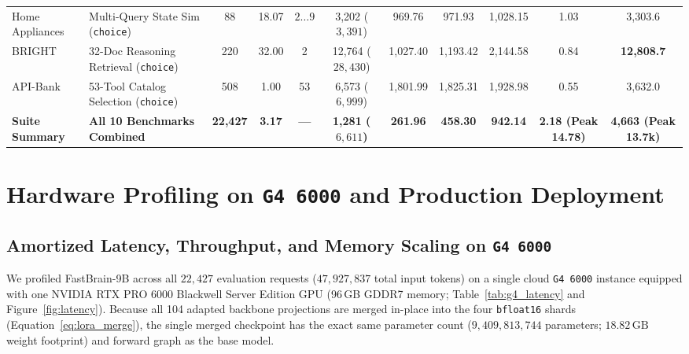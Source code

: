 \documentclass[10pt,twocolumn]{article}
\begin{document}
\begin{table}[t]
{\begin{tabular}{llccccccccc}
Home Appliances & Multi-Query State Sim (\texttt{choice}) & 88 & 18.07 & $2\dots 9$ & 3,202 ($3{,}391$) & 969.76 & 971.93 & 1,028.15 & 1.03 & 3,303.6 \\
BRIGHT & 32-Doc Reasoning Retrieval (\texttt{choice}) & 220 & 32.00 & 2 & 12,764 ($28{,}430$) & 1,027.40 & 1,193.42 & 2,144.58 & 0.84 & \textbf{12,808.7} \\
API-Bank & 53-Tool Catalog Selection (\texttt{choice}) & 508 & 1.00 & 53 & 6,573 ($6{,}999$) & 1,801.99 & 1,825.31 & 1,928.98 & 0.55 & 3,632.0 \\
\midrule
\textbf{Suite Summary} & \textbf{All 10 Benchmarks Combined} & \textbf{22,427} & \textbf{3.17} & \textbf{---} & \textbf{1,281 ($6{,}611$)} & \textbf{261.96} & \textbf{458.30} & \textbf{942.14} & \textbf{2.18 (Peak 14.78)} & \textbf{4,663 (Peak 13.7k)} \\
\bottomrule
\end{tabular}%
}
\end{table}

\section{Hardware Profiling on \texttt{G4 6000} and Production Deployment}
\label{sec:hardware}

\subsection{Amortized Latency, Throughput, and Memory Scaling on \texttt{G4 6000}}
We profiled FastBrain-9B across all $22{,}427$ evaluation requests ($47{,}927{,}837$ total input tokens) on a single cloud \texttt{G4 6000} instance equipped with one NVIDIA RTX PRO 6000 Blackwell Server Edition GPU (96\,GB GDDR7 memory; Table~\ref{tab:g4_latency} and Figure~\ref{fig:latency}). Because all 104 adapted backbone projections are merged in-place into the four \texttt{bfloat16} shards (Equation~\ref{eq:lora_merge}), the single merged checkpoint has the exact same parameter count ($9{,}409{,}813{,}744$ parameters; $18.82\,\text{GB}$ weight footprint) and forward graph as the base model.
\end{document}
